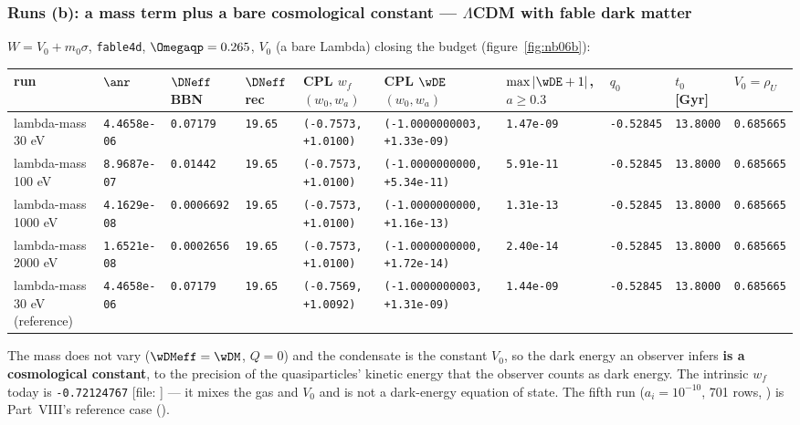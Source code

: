 \subsubsection{Runs (b): a mass term plus a bare cosmological constant --- \texorpdfstring{$\Lambda$}{Lambda}CDM with fable dark matter}
\label{sec:4.7.5}

$W=V_0+m_0\sigma$, \texttt{fable4d}, $\Omegaqp=0.265$, $V_0$ (a bare Lambda) closing the budget  (figure~\ref{fig:nb06b}):

\begin{landscape}
{\scriptsize
\setlength{\tabcolsep}{4pt}
\begin{longtable}{@{}llllllllll@{}}
\toprule
run & $\anr$ & $\DNeff$ BBN & $\DNeff$ rec & CPL $w_f$ $(w_0,w_a)$ & CPL $\wDE$ $(w_0,w_a)$ & $\max|\wDE+1|$, $a\geq0.3$ & $q_0$ & $t_0$ [Gyr] & $V_0=\rho_U$ \tabularnewline
\midrule
\endhead
lambda-mass 30 eV & \texttt{4.4658e-06} & \texttt{0.07179} & \texttt{19.65} & \texttt{(-0.7573, +1.0100)} & \texttt{(-1.0000000003, +1.33e-09)} & \texttt{1.47e-09} & \texttt{-0.52845} & \texttt{13.8000} & \texttt{0.685665} \tabularnewline
lambda-mass 100 eV & \texttt{8.9687e-07} & \texttt{0.01442} & \texttt{19.65} & \texttt{(-0.7573, +1.0100)} & \texttt{(-1.0000000000, +5.34e-11)} & \texttt{5.91e-11} & \texttt{-0.52845} & \texttt{13.8000} & \texttt{0.685665} \tabularnewline
lambda-mass 1000 eV & \texttt{4.1629e-08} & \texttt{0.0006692} & \texttt{19.65} & \texttt{(-0.7573, +1.0100)} & \texttt{(-1.0000000000, +1.16e-13)} & \texttt{1.31e-13} & \texttt{-0.52845} & \texttt{13.8000} & \texttt{0.685665} \tabularnewline
lambda-mass 2000 eV & \texttt{1.6521e-08} & \texttt{0.0002656} & \texttt{19.65} & \texttt{(-0.7573, +1.0100)} & \texttt{(-1.0000000000, +1.72e-14)} & \texttt{2.40e-14} & \texttt{-0.52845} & \texttt{13.8000} & \texttt{0.685665} \tabularnewline
lambda-mass 30 eV (reference) & \texttt{4.4658e-06} & \texttt{0.07179} & \texttt{19.65} & \texttt{(-0.7569, +1.0092)} & \texttt{(-1.0000000003, +1.31e-09)} & \texttt{1.44e-09} & \texttt{-0.52845} & \texttt{13.8000} & \texttt{0.685665} \tabularnewline
\bottomrule
\end{longtable}
}
\end{landscape}

The mass does not vary ($\wDMeff=\wDM$, $Q=0$) and the condensate is the constant $V_0$, so the dark energy an
observer infers \textbf{is a cosmological constant}, to the precision of the quasiparticles' kinetic energy
that the observer counts as dark energy. The intrinsic $w_f$ today is \texttt{-0.72124767} [file:
] --- it mixes the gas and $V_0$ and is not a dark-energy equation of state. The fifth run
($a_i=10^{-10}$, 701 rows, ) is Part~VIII's reference case
().

